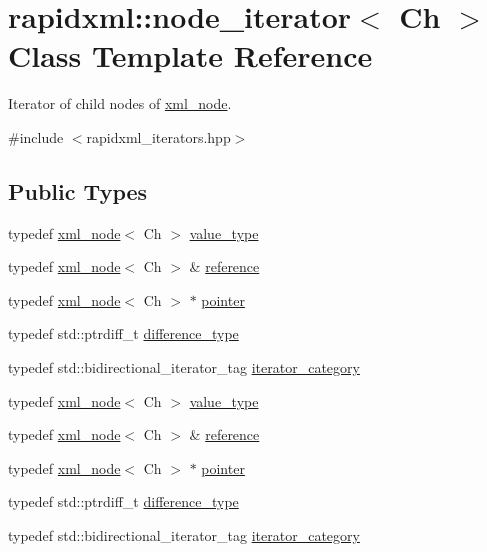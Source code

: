 \hypertarget{classrapidxml_1_1node__iterator}{}\section{rapidxml\+:\+:node\+\_\+iterator$<$ Ch $>$ Class Template Reference}
\label{classrapidxml_1_1node__iterator}


Iterator of child nodes of \mbox{\hyperlink{classrapidxml_1_1xml__node}{xml\+\_\+node}}.  




{\ttfamily \#include $<$rapidxml\+\_\+iterators.\+hpp$>$}

\subsection*{Public Types}
\begin{DoxyCompactItemize}
\item 
typedef \mbox{\hyperlink{classrapidxml_1_1xml__node}{xml\+\_\+node}}$<$ Ch $>$ \mbox{\hyperlink{classrapidxml_1_1node__iterator_ade6310119ed1f72c94830e006fac69b7}{value\+\_\+type}}
\item 
typedef \mbox{\hyperlink{classrapidxml_1_1xml__node}{xml\+\_\+node}}$<$ Ch $>$ \& \mbox{\hyperlink{classrapidxml_1_1node__iterator_ad7fabbcb7d3d9e4e220299c5475b9e9c}{reference}}
\item 
typedef \mbox{\hyperlink{classrapidxml_1_1xml__node}{xml\+\_\+node}}$<$ Ch $>$ $\ast$ \mbox{\hyperlink{classrapidxml_1_1node__iterator_a65dca8bca2b9c29f635b9ad0bdeeecb9}{pointer}}
\item 
typedef std\+::ptrdiff\+\_\+t \mbox{\hyperlink{classrapidxml_1_1node__iterator_a5bdc462b980a52c5fa2d99ac9f4f4bff}{difference\+\_\+type}}
\item 
typedef std\+::bidirectional\+\_\+iterator\+\_\+tag \mbox{\hyperlink{classrapidxml_1_1node__iterator_a8e82d75f768e17bf7349d010ee26c037}{iterator\+\_\+category}}
\item 
typedef \mbox{\hyperlink{classrapidxml_1_1xml__node}{xml\+\_\+node}}$<$ Ch $>$ \mbox{\hyperlink{classrapidxml_1_1node__iterator_ade6310119ed1f72c94830e006fac69b7}{value\+\_\+type}}
\item 
typedef \mbox{\hyperlink{classrapidxml_1_1xml__node}{xml\+\_\+node}}$<$ Ch $>$ \& \mbox{\hyperlink{classrapidxml_1_1node__iterator_ad7fabbcb7d3d9e4e220299c5475b9e9c}{reference}}
\item 
typedef \mbox{\hyperlink{classrapidxml_1_1xml__node}{xml\+\_\+node}}$<$ Ch $>$ $\ast$ \mbox{\hyperlink{classrapidxml_1_1node__iterator_a65dca8bca2b9c29f635b9ad0bdeeecb9}{pointer}}
\item 
typedef std\+::ptrdiff\+\_\+t \mbox{\hyperlink{classrapidxml_1_1node__iterator_a5bdc462b980a52c5fa2d99ac9f4f4bff}{difference\+\_\+type}}
\item 
typedef std\+::bidirectional\+\_\+iterator\+\_\+tag \mbox{\hyperlink{classrapidxml_1_1node__iterator_a8e82d75f768e17bf7349d010ee26c037}{iterator\+\_\+category}}
\end{DoxyCompactItemize}
